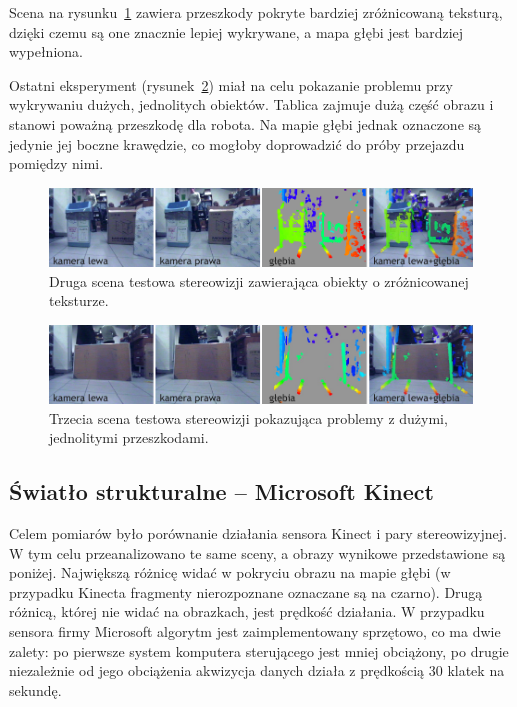 Scena na rysunku~\ref{fig:stereo_2} zawiera przeszkody pokryte bardziej zróżnicowaną
teksturą, dzięki czemu są one znacznie lepiej wykrywane, a mapa głębi jest bardziej
wypełniona.

Ostatni eksperyment (rysunek~\ref{fig:stereo_3}) miał na celu pokazanie problemu
przy wykrywaniu dużych, jednolitych obiektów. Tablica zajmuje dużą część obrazu
i stanowi poważną przeszkodę dla robota. Na mapie głębi jednak oznaczone są jedynie
jej boczne krawędzie, co mogłoby doprowadzić do próby przejazdu pomiędzy nimi.

\begin{figure}[h!]
\centering
\includegraphics{../../Common/img/stereo_2}
\caption[Druga scena testowa stereowizji]{Druga scena testowa stereowizji zawierająca obiekty o zróżnicowanej teksturze.}
\label{fig:stereo_2}
\end{figure}

\begin{figure}[h!]
\centering
\includegraphics{../../Common/img/stereo_3}
\caption[Trzecia scena testowa stereowizji]{Trzecia scena testowa stereowizji pokazująca problemy z dużymi, jednolitymi przeszkodami.}
\label{fig:stereo_3}
\end{figure}

\subsection{Światło strukturalne -- Microsoft Kinect}

Celem pomiarów było porównanie działania sensora Kinect i pary stereowizyjnej.
W tym celu przeanalizowano te same sceny, a obrazy wynikowe przedstawione są
poniżej. Największą różnicę widać w pokryciu obrazu na mapie głębi (w przypadku
Kinecta fragmenty nierozpoznane oznaczane są na czarno). Drugą różnicą, której
nie widać na obrazkach, jest prędkość działania. W przypadku sensora
firmy Microsoft algorytm jest zaimplementowany sprzętowo, co ma dwie zalety:
po pierwsze system komputera sterującego jest mniej obciążony, po drugie niezależnie
od jego obciążenia akwizycja danych działa z prędkością 30 klatek na sekundę.

